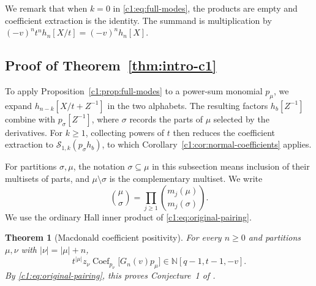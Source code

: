 \documentclass[12pt,reqno,a4paper]{amsart}
\numberwithin{equation}{section}
\numberwithin{figure}{section}
\theoremstyle{plain}
\newtheorem{theorem}{Theorem}[section]
\theoremstyle{definition}
\DeclareMathOperator{\Coef}{Coef}
\begin{document}
We remark that when $k=0$ in \eqref{c1:eq:full-modes}, the products are
empty and coefficient extraction is the identity.  The summand is multiplication by
$(-v)^n t^n h_n[X/t]=(-v)^n h_n[X]$.

\subsection{Proof of Theorem~\ref{thm:intro-c1}}
\label{c1:subsec:conjecture-one}

To apply Proposition~\ref{c1:prop:full-modes} to a power-sum monomial
$p_\mu$, we expand $h_{n-k}[X/t+Z^{-1}]$ in the two alphabets.
The resulting factors $h_b[Z^{-1}]$ combine with $p_\sigma[Z^{-1}]$,
where $\sigma$ records the parts of $\mu$ selected by the derivatives.
For $k\geq1$, collecting powers of $t$ then reduces the coefficient
extraction to $\mathcal S_{1,k}(p_\sigma h_b)$, to which
Corollary~\ref{c1:cor:normal-coefficients} applies.

For partitions $\sigma,\mu$, the notation $\sigma\subseteq\mu$ in
this subsection means inclusion of their multisets of parts, and
$\mu\setminus\sigma$ is the complementary multiset.  We write
\[
 \binom\mu\sigma
   =\prod_{j\geq1}\binom{m_j(\mu)}{m_j(\sigma)}.
\]
We use the ordinary Hall inner product of \eqref{c1:eq:original-pairing}.

\begin{theorem}[Macdonald coefficient positivity]
\label{c1:thm:conjecture-one}
For every $n\geq0$ and partitions $\mu,\nu$ with
$|\nu|=|\mu|+n$,
\[
 t^{|\mu|}z_\nu\Coef_{p_\nu}\bigl[G_n(v)p_\mu\bigr]
       \in\mathbb N[q-1,t-1,-v].
\]
By \eqref{c1:eq:original-pairing}, this proves
Conjecture~1 of \cite{BD26}.
\end{theorem}
\end{document}
